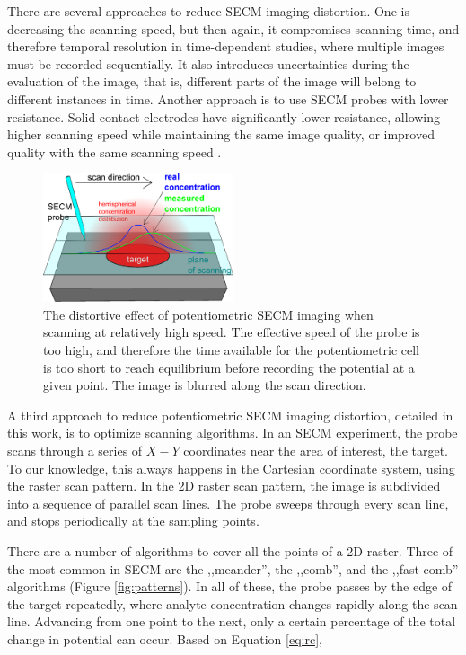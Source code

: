 \documentclass[3p]{elsarticle}
\begin{document}
There are several approaches to reduce SECM imaging distortion. One is decreasing the scanning speed, but then again, it compromises scanning time, and therefore temporal resolution in time-dependent studies, where multiple images must be recorded sequentially. It also introduces uncertainties during the evaluation of the image, that is, different parts of the image will belong to different instances in time. Another approach is to use SECM probes with lower resistance. Solid contact electrodes have significantly lower resistance, allowing higher scanning speed while maintaining the same image quality, or improved quality with the same scanning speed \cite{solid, spatially}.

\begin{figure}
\centering
\includegraphics[width=0.5\textwidth]{distortion.eps}
\caption{The distortive effect of potentiometric SECM imaging when scanning at relatively high speed. The effective speed of the probe is too high, and therefore the time available for the potentiometric cell is too short to reach equilibrium before recording the potential at a given point. The image is blurred along the scan direction.}
\label{fig:distortion}
\end{figure}

A third approach to reduce potentiometric SECM imaging distortion, detailed in this work, is to optimize scanning algorithms. In an SECM experiment, the probe scans through a series of $X-Y$ coordinates near the area of interest, the target. To our knowledge, this always happens in the Cartesian coordinate system, using the raster scan pattern. In the 2D raster scan pattern, the image is subdivided into a sequence of parallel scan lines. The probe sweeps through every scan line, and stops periodically at the sampling points. 

There are a number of algorithms to cover all the points of a 2D raster. Three of the most common in SECM are the ,,meander'', the ,,comb'', and the ,,fast comb'' algorithms (Figure \ref{fig:patterns}). In all of these, the probe passes by the edge of the target repeatedly, where analyte concentration changes rapidly along the scan line. Advancing from one point to the next, only a certain percentage of the total change in potential can occur. Based on Equation \ref{eq:rc},
\end{document}
